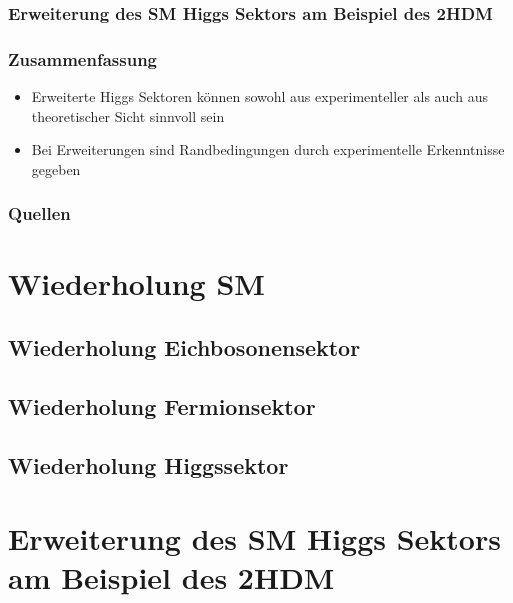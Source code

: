 \documentclass{beamer}
\begin{document}
\begin{frame}
\frametitle{Erweiterung des SM Higgs Sektors am Beispiel des 2HDM}
\end{frame}

\begin{frame}
\frametitle{Zusammenfassung}
\begin{itemize}
\item Erweiterte Higgs Sektoren können sowohl aus experimenteller als auch aus theoretischer Sicht sinnvoll sein
\item Bei Erweiterungen sind Randbedingungen durch experimentelle Erkenntnisse gegeben 
\end{itemize}

\end{frame}

\begin{frame} 
\frametitle{Quellen}
\section{Wiederholung SM}
\subsection{Wiederholung Eichbosonensektor}
\subsection{Wiederholung Fermionsektor}
\subsection{Wiederholung Higgssektor}
\section{Erweiterung des SM Higgs Sektors am Beispiel des 2HDM}
\printbibliography
\end{frame}

 
\end{document}
